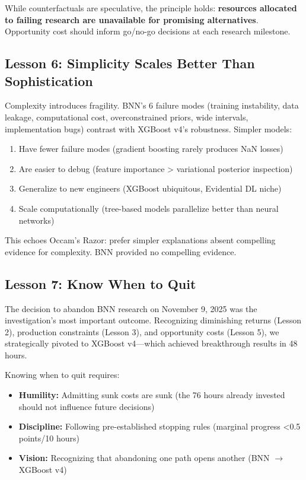 While counterfactuals are speculative, the principle holds: \textbf{resources allocated to failing research are unavailable for promising alternatives}. Opportunity cost should inform go/no-go decisions at each research milestone.

\subsection{Lesson 6: Simplicity Scales Better Than Sophistication}

Complexity introduces fragility. BNN's 6 failure modes (training instability, data leakage, computational cost, overconstrained priors, wide intervals, implementation bugs) contrast with XGBoost v4's robustness. Simpler models:

\begin{enumerate}[itemsep=2pt,parsep=0pt]
    \item Have fewer failure modes (gradient boosting rarely produces NaN losses)
    \item Are easier to debug (feature importance > variational posterior inspection)
    \item Generalize to new engineers (XGBoost ubiquitous, Evidential DL niche)
    \item Scale computationally (tree-based models parallelize better than neural networks)
\end{enumerate}

This echoes Occam's Razor: prefer simpler explanations absent compelling evidence for complexity. BNN provided no compelling evidence.

\subsection{Lesson 7: Know When to Quit}

The decision to abandon BNN research on November 9, 2025 was the investigation's most important outcome. Recognizing diminishing returns (Lesson 2), production constraints (Lesson 3), and opportunity costs (Lesson 5), we strategically pivoted to XGBoost v4---which achieved breakthrough results in 48 hours.

Knowing when to quit requires:
\begin{itemize}[itemsep=2pt,parsep=0pt]
    \item \textbf{Humility:} Admitting sunk costs are sunk (the 76 hours already invested should not influence future decisions)
    \item \textbf{Discipline:} Following pre-established stopping rules (marginal progress <0.5 points/10 hours)
    \item \textbf{Vision:} Recognizing that abandoning one path opens another (BNN $\to$ XGBoost v4)
\end{itemize}

